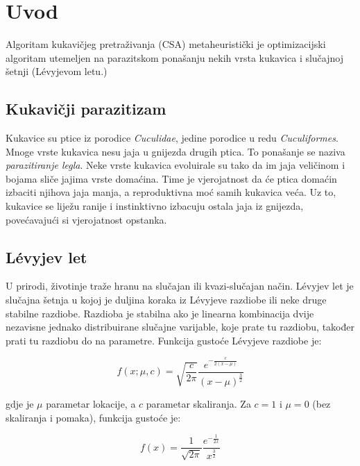 
\section{Uvod}
\hspace{\parindent} Algoritam kukavičjeg pretraživanja \cite{gandomi2013}  (CSA) metaheuristički je optimizacijski algoritam utemeljen na parazitskom ponašanju nekih vrsta kukavica i slučajnoj šetnji (L\'evyjevom letu.) 



\subsection{Kukavičji parazitizam}
\hspace{\parindent}Kukavice su ptice iz porodice \textit{Cuculidae}, jedine porodice u redu \textit{Cuculiformes}. Mnoge vrste kukavica nesu jaja u gnijezda drugih ptica. To ponašanje se naziva \textit{parazitiranje legla}.  Neke vrste kukavica evoluirale su tako da im jaja veličinom i bojama sliče jajima vrste domaćina. Time je vjerojatnost da će ptica domaćin izbaciti njihova jaja manja, a reproduktivna moć samih kukavica veća. Uz to, kukavice se liježu ranije i instinktivno izbacuju ostala jaja iz gnijezda, povećavajući si vjerojatnost opstanka.

\subsection{L\'evyjev let}
\hspace{\parindent}U prirodi, životinje traže hranu na slučajan ili kvazi-slučajan način. L\'evyjev let je slučajna šetnja u kojoj je duljina koraka iz L\'evyjeve razdiobe ili neke druge stabilne razdiobe. Razdioba je stabilna ako je linearna kombinacija dvije nezavisne jednako distribuirane slučajne varijable, koje prate tu razdiobu, također prati tu razdiobu do na parametre. Funkcija gustoće L\'evyjeve razdiobe je:

\begin{equation}
    f(x;\mu, c) = \sqrt{\frac{c}{2\pi}}\frac{e^{-\frac{c}{2(x-\mu)}}}{(x-\mu)^{\frac{3}{2}}}
\end{equation}

gdje je $\mu$ parametar lokacije, a $c$ parametar skaliranja. Za $c = 1$ i $\mu = 0$ (bez skaliranja i pomaka), funkcija gustoće je:

\begin{equation}
    f(x) = \frac{1}{\sqrt{2\pi}}\frac{e^{-\frac{1}{2x}}}{x^{\frac{3}{2}}}
\end{equation}

